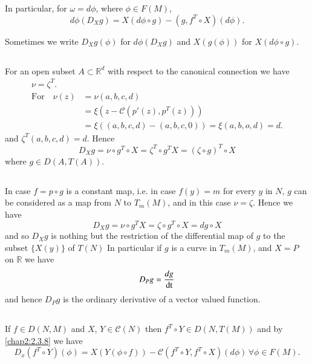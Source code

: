 In particular, for $\omega=d\phi$, where $\phi\in F(M)$,
\begin{equation*}
d\phi(D_{X}g)=X(d\phi\circ g)-(g,f^{T}\circ X)(d\phi).\tag{2.3.8}\label{chap2:2.3.8}
\end{equation*}

Sometimes we write $D_{X}g(\phi)$ for $d\phi(D_{X}g)$ and $X(g(\phi))$
for $X(d\phi\circ g)$.


\setcounter{subsection}{8}
\subsection{}\label{chap2:2.3.9}

\begin{examples*}
For an open subset $A\subset \mathbb{R}^{d}$ with respect to the
canonical connection we have
\begin{align*}
\nu = \zeta^{T}.\\
\text{For}\quad \nu(z) &= \nu(a,b,c,d)\tag{2.3.10}\label{chap2:2.3.10}\\
&= \xi(z-\mathcal{C}(p'(z),p^{T}(z)))\\
&= \xi ((a,b,c,d)-(a,b,c,0))=\xi(a,b,o,d)=d.
\end{align*}
and $\zeta^{T}(a,b,c,d)=d$. Hence
$$
D_{X}g=\nu\circ g^{T}\circ X=\zeta^{T}\circ g^{T}X=(\zeta\circ
g)^{T}\circ X
$$
where $g\in D(A,T(A))$.
\end{examples*}

\setcounter{subsection}{10}
\subsection{}\label{chap2:2.3.11}
In case $f=p\circ g$ is a constant map, i.e. in case $f(y)=m$ for
every $y$ in $N$, $g$ can be considered as a map from $N$ to
$T_{m}(M)$, and in this case $\nu=\zeta$. Hence we have
$$
D_{X}g=\nu\circ g^{T}X=\zeta\circ g^{T}\circ X=dg\circ X
$$
and so $D_{X}g$ is nothing but the restriction of the differential map
of \pageoriginale $g$ to the subset $\{X(y)\}$ of $T(N)$ In particular
if $g$ is a 
curve in $T_{m}(M)$, and $X=P$ on $\mathbb{R}$ we have
$$
D_{P}g=\dfrac{dg}{\operatorname{dt}}
$$
and hence $D_{P}g$ is the ordinary derivative of a vector valued
function.

\setcounter{subsection}{11}
\subsection{}\label{chap2:2.3.12}
If $f\in D(N,M)$ and $X$, $Y\in \mathscr{C}(N)$ then $f^{T}\circ Y\in
D(N,T(M))$ and by \eqref{chap2:2.3.8} we have
\begin{equation*}
D_{x}(f^{T}\circ Y)(\phi)=X(Y(\phi\circ f))-\mathcal{C}(f^{T}\circ
Y,f^{T}\circ X)(d\phi)\,\forall \phi\in F(M).\tag{2.3.13}\label{chap2:2.3.13}
\end{equation*}

